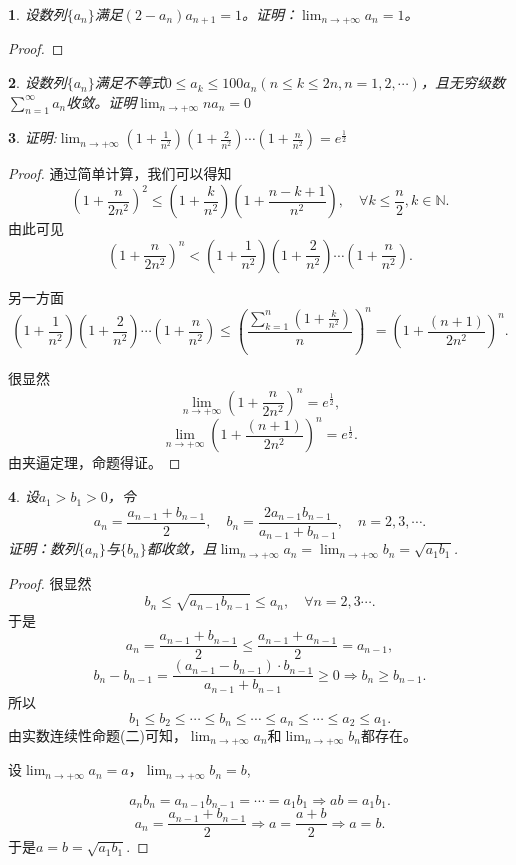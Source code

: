 \documentclass[utf8]{book}
\newtheorem{example}{}[section]             %
\begin{document}
\begin{example}
设数列$\{a_n\}$满足$(2-a_n)a_{n+1} = 1$。证明：$\displaystyle\lim_{n\to +\infty}a_{n}=1$。
\end{example}
\begin{proof}

\end{proof}
\begin{example}
设数列$\{a_n\}$满足不等式$0\leq a_k\leq 100a_n(n\leq k\leq 2n, n=1,2,\cdots)$，且无穷级数$\displaystyle\sum_{n=1}^{\infty}a_n$收敛。证明$\displaystyle\lim_{n\to +\infty}na_n=0$
\end{example}
\begin{example}
证明:$\displaystyle\lim_{n\to +\infty}\left(1+\frac{1}{n^2}\right)\left(1+\frac{2}{n^2}\right)\cdots\left(1+\frac{n}{n^2}\right)=e^{\frac{1}{2}}$
\end{example}
\begin{proof}
通过简单计算，我们可以得知
$$\left(1+\frac{n}{2n^2}\right)^2 \leq \left(1+\frac{k}{n^2}\right)\left(1+\frac{n-k+1}{n^2}\right), \quad\forall k \leq \frac{n}{2}, k\in\mathbb{N}.$$
由此可见
$$\left(1+\frac{n}{2n^2}\right)^n < \left(1+\frac{1}{n^2}\right)\left(1+\frac{2}{n^2}\right)\cdots\left(1+\frac{n}{n^2}\right).$$

另一方面
$$\left(1+\frac{1}{n^2}\right)\left(1+\frac{2}{n^2}\right)\cdots\left(1+\frac{n}{n^2}\right) \leq \left(\frac{\displaystyle\sum_{k=1}^{n}\left(1+\frac{k}{n^2}\right)}{n}\right)^n=\left(1+\frac{(n+1)}{2n^2}\right)^n.$$

很显然
$$\displaystyle\lim_{n\to +\infty}\left(1+\frac{n}{2n^2}\right)^n=e^{\frac{1}{2}},$$
$$\displaystyle\lim_{n\to +\infty}\left(1+\frac{(n+1)}{2n^2}\right)^n=e^{\frac{1}{2}}.$$
由夹逼定理，命题得证。
\end{proof}
\begin{example}
设$a_1>b_1>0$，令$$a_n=\displaystyle\frac{a_{n-1}+b_{n-1}}{2},\quad b_n=\frac{2a_{n-1}b_{n-1}}{a_{n-1}+b_{n-1}}, \quad n = 2,3,\cdots.$$ 证明：数列$\{a_n\}$与$\{b_n\}$都收敛，且$\displaystyle\lim_{n\to +\infty}a_n=\displaystyle\lim_{n\to +\infty}b_n=\sqrt{a_1b_1}$.
\end{example}
\begin{proof}很显然
$$b_n \leq \sqrt{a_{n-1}b_{n-1}}\leq a_n,\quad\forall n = 2,3\cdots.$$
于是
$$a_n =\displaystyle\frac{a_{n-1}+b_{n-1}}{2} \leq \displaystyle\frac{a_{n-1}+a_{n-1}}{2} = a_{n-1},$$
$$b_n -b_{n-1} = \frac{(a_{n-1}-b_{n-1})\cdot b_{n-1}}{a_{n-1}+b_{n-1}} \geq 0\Rightarrow b_n \geq b_{n-1}.$$
所以
$$b_1 \leq b_2\leq \cdots \leq b_n \leq \cdots \leq a_n \leq \cdots \leq a_2\leq a_1.$$
由实数连续性命题(二)可知，$\displaystyle\lim_{n\to +\infty}a_n$和$\displaystyle\lim_{n\to +\infty}b_n$都存在。 

设$\displaystyle\lim_{n\to +\infty}a_n=a$，$\displaystyle\lim_{n\to +\infty}b_n=b$,

$$a_nb_n=a_{n-1}b_{n-1}=\cdots = a_1b_1\Rightarrow ab = a_1b_1.$$
$$a_n=\displaystyle\frac{a_{n-1}+b_{n-1}}{2}\Rightarrow a=\frac{a+b}{2}\Rightarrow a=b.$$
于是$a=b=\sqrt{a_1b_1}$.
\end{proof}
\end{document}
